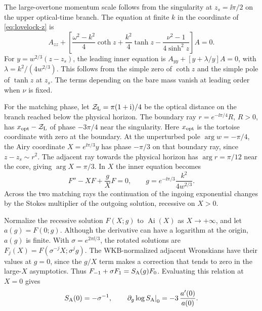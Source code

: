 The large-overtone momentum scale follows from the singularity
at \(z_s=\ii\pi/2\) on the upper optical-time branch. The equation
at finite \(k\) in the coordinate of \eqref{eq:lovelock-z} is
\begin{equation}
 A_{zz}+\left[
  \frac{\omega^2-k^2}{4}\coth z+\frac{k^2}{4}\tanh z
        -\frac{\nu^2-1}{4\sinh^2 z}\right]A=0 .
 \label{eq:lovelock-k-z}
\end{equation}
For \(y=w^{2/3}(z-z_s)\), the leading inner equation is
\(A_{yy}+[y+\lambda/y]A=0\), with
\(\lambda=k^2/(4w^{2/3})\). This follows from the simple zero of
\(\coth z\) and the simple pole of \(\tanh z\) at \(z_s\).
The terms depending on the bare mass vanish at leading order
when \(\nu\) is fixed.

For the matching phase, let \(\mathcal Z_{\rm L}=\pi(1+\mathrm{i})/4\)
be the optical distance on the branch reached below the
physical horizon. The boundary ray \(r=e^{-\ii\pi/4}R\), \(R>0\),
has \(x_{\rm opt}-\mathcal Z_{\rm L}\) of phase \(-3\pi/4\)
near the singularity. Here \(x_{\rm opt}\) is the tortoise
coordinate with zero at the boundary. At the unperturbed pole
\(\arg w=-\pi/4\), the Airy coordinate \(X=e^{\ii\pi/3}y\)
has phase \(-\pi/3\) on that boundary ray, since
\(z-z_s\sim r^2\). The adjacent ray towards the physical
horizon has \(\arg r=\pi/12\) near the core, giving
\(\arg X=\pi/3\). In \(X\) the inner equation becomes
\begin{equation}
 F''-XF+\frac{g}{X}F=0,\qquad
 g=e^{-\ii\pi/3}\frac{k^2}{4w^{2/3}}.
 \label{eq:lovelock-perturbed-airy}
\end{equation}
Across the two matching rays the continuation of the
ingoing exponential changes by the Stokes multiplier of
the outgoing solution, recessive on \(X>0\).

Normalize the recessive solution \(F(X;g)\) to \(\operatorname{Ai}(X)\)
as \(X\to+\infty\), and let \(a(g)=F(0;g)\).
Although the derivative can have a logarithm at the origin,
\(a(g)\) is finite. With \(\sigma=e^{2\pi\ii/3}\), the rotated
solutions are \(F_j(X)=F(\sigma^{-j}X;\sigma^j g)\).
The WKB-normalized adjacent Wronskians have their values at \(g=0\),
since the \(g/X\) term makes a correction that tends to zero
in the large-\(X\) asymptotics. Thus
\(F_{-1}+\sigma F_1=S_{\rm A}(g)F_0\).
Evaluating this relation at \(X=0\) gives
\begin{equation}
 S_{\rm A}(0)=-\sigma^{-1},\qquad
 \left.\partial_g\log S_{\rm A}\right|_{0}=-3\,\frac{a'(0)}{a(0)}.
\end{equation}


